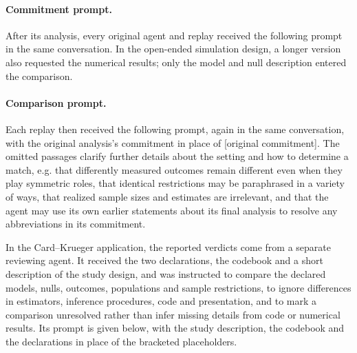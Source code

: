 \documentclass[10pt]{article}
\begin{document}
\paragraph{Commitment prompt.} After its analysis, every original agent and replay received the following prompt in the same conversation. In the open-ended simulation design, a longer version also requested the numerical results; only the model and null description entered the comparison.

\paragraph{Comparison prompt.} Each replay then received the following prompt, again in the same conversation, with the original analysis's commitment in place of [original commitment].
The omitted passages clarify further details about the setting and how to determine a match, e.g. that differently measured outcomes remain different even when they play symmetric roles, that identical restrictions may be paraphrased in a variety of ways, that realized sample sizes and estimates are irrelevant, and that the agent may use its own earlier statements about its final analysis to resolve any abbreviations in its commitment.

In the Card--Krueger application, the reported verdicts come from a separate reviewing agent. It received the two declarations, the codebook and a short description of the study design, and was instructed to compare the declared models, nulls, outcomes, populations and sample restrictions, to ignore differences in estimators, inference procedures, code and presentation, and to mark a comparison unresolved rather than infer missing details from code or numerical results. Its prompt is given below, with the study description, the codebook and the declarations in place of the bracketed placeholders.
\end{document}
